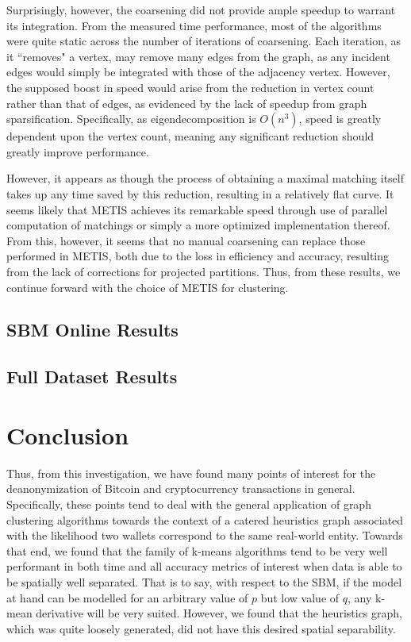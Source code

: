 \documentclass{article}
\begin{document}
Surprisingly, however, the coarsening did not provide ample speedup to warrant its integration. From the measured time performance, most of the algorithms were quite static across the number of iterations of coarsening. Each iteration, as it ``removes" a vertex, may remove many edges from the graph, as any incident edges would simply be integrated with those of the adjacency vertex. However, the supposed boost in speed would arise from the reduction in vertex count rather than that of edges, as evidenced by the lack of speedup from graph sparsification. Specifically, as eigendecomposition is $O(n^3)$, speed is greatly dependent upon the vertex count, meaning any significant reduction should greatly improve performance. 

However, it appears as though the process of obtaining a maximal matching itself takes up any time saved by this reduction, resulting in a relatively flat curve. It seems likely that METIS achieves its remarkable speed through use of parallel computation of matchings or simply a more optimized implementation thereof. From this, however, it seems that no manual coarsening can replace those performed in METIS, both due to the loss in efficiency and accuracy, resulting from the lack of corrections for projected partitions. Thus, from these results, we continue forward with the choice of METIS for clustering.

\subsection{SBM Online Results}

\subsection{Full Dataset Results}

\clearpage
\section{Conclusion}\label{conclusion}
Thus, from this investigation, we have found many points of interest for the deanonymization of Bitcoin and cryptocurrency transactions in general. Specifically, these points tend to deal with the general application of graph clustering algorithms towards the context of a catered heuristics graph associated with the likelihood two wallets correspond to the same real-world entity. Towards that end, we found that the family of k-means algorithms tend to be very well performant in both time and all accuracy metrics of interest when data is able to be spatially well separated. That is to say, with respect to the SBM, if the model at hand can be modelled for an arbitrary value of $p$ but low value of $q$, any k-mean derivative will be very suited. However, we found that the heuristics graph, which was quite loosely generated, did not have this desired spatial separability.
\end{document}
